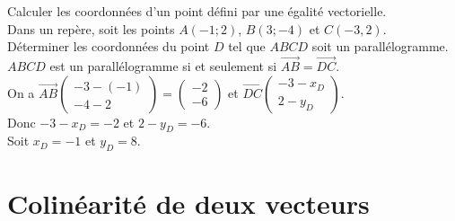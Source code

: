 \begin{Méthode}Calculer les coordonnées d'un point défini par une égalité vectorielle. \\
Dans un repère, soit les points $A(-1;2)$, $B(3;-4)$ et $C(-3,2)$.\\
Déterminer les coordonnées du point $D$ tel que $ABCD$ soit un parallélogramme. 
\\
$ABCD$ est un parallélogramme si et seulement si $\overrightarrow{AB}=\overrightarrow{DC}$. \\
On a $\overrightarrow{AB}\begin{pmatrix} 
-3-(-1) \\
-4-2
 \end{pmatrix}=\begin{pmatrix} 
-2 \\
-6
 \end{pmatrix}$ et $\overrightarrow{DC}\begin{pmatrix} 
-3-x_D \\
2-y_D
 \end{pmatrix}$. \\
 Donc $-3-x_D=-2$ et $2-y_D=-6$.\\
 Soit $x_D=-1$ et $y_D=8$. 
 
\end{Méthode}

\vspace{0.5cm}

\section{Colinéarité de deux vecteurs}
